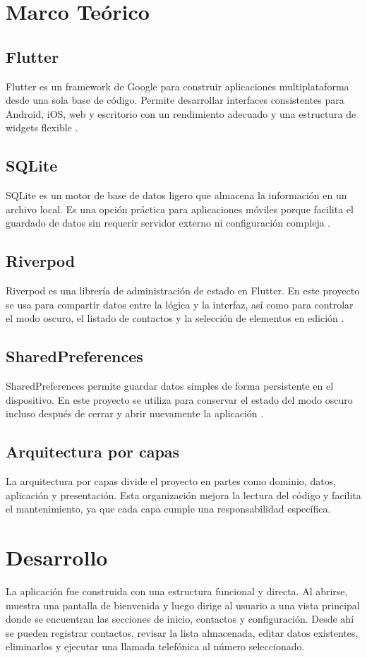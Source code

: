 \documentclass[12pt,a4paper]{article}
\begin{document}
\section{Marco Teórico}
\subsection{Flutter}
Flutter es un framework de Google para construir aplicaciones multiplataforma desde una sola base de código. Permite desarrollar interfaces consistentes para Android, iOS, web y escritorio con un rendimiento adecuado y una estructura de widgets flexible \citep{flutter}.

\subsection{SQLite}
SQLite es un motor de base de datos ligero que almacena la información en un archivo local. Es una opción práctica para aplicaciones móviles porque facilita el guardado de datos sin requerir servidor externo ni configuración compleja \citep{sqlite}.

\subsection{Riverpod}
Riverpod es una librería de administración de estado en Flutter. En este proyecto se usa para compartir datos entre la lógica y la interfaz, así como para controlar el modo oscuro, el listado de contactos y la selección de elementos en edición \citep{riverpod}.

\subsection{SharedPreferences}
SharedPreferences permite guardar datos simples de forma persistente en el dispositivo. En este proyecto se utiliza para conservar el estado del modo oscuro incluso después de cerrar y abrir nuevamente la aplicación \citep{sharedprefs}.

\subsection{Arquitectura por capas}
La arquitectura por capas divide el proyecto en partes como dominio, datos, aplicación y presentación. Esta organización mejora la lectura del código y facilita el mantenimiento, ya que cada capa cumple una responsabilidad específica.

\section{Desarrollo}
La aplicación fue construida con una estructura funcional y directa. Al abrirse, muestra una pantalla de bienvenida y luego dirige al usuario a una vista principal donde se encuentran las secciones de inicio, contactos y configuración. Desde ahí se pueden registrar contactos, revisar la lista almacenada, editar datos existentes, eliminarlos y ejecutar una llamada telefónica al número seleccionado.
\end{document}
